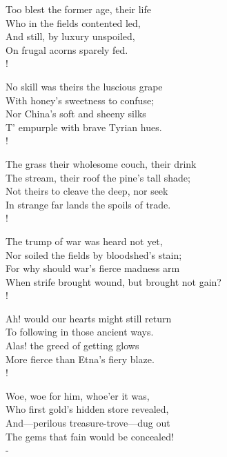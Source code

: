 \documentclass[12pt]{book}
\newenvironment{vpoem}[1]%
  {\def\poemvsindentlines{#1}\begin{poem}\small}%
  {\end{poem}\def\poemvsindentlines{\relax}}
\begin{document}
\begin{vpoem}{24}
    Too blest the former age, their life \\
      Who in the fields contented led, \\
    And still, by luxury unspoiled, \\
      On frugal acorns sparely fed. \\!

    No skill was theirs the luscious grape \\
      With honey's sweetness to confuse; \\
    Nor China's soft and sheeny silks \\
      T' empurple with brave Tyrian hues. \\!

    The grass their wholesome couch, their drink \\
      The stream, their roof the pine's tall shade; \\
    Not theirs to cleave the deep, nor seek \\
      In strange far lands the spoils of trade. \\!

    The trump of war was heard not yet, \\
      Nor soiled the fields by bloodshed's stain; \\
    For why should war's fierce madness arm \\
      When strife brought wound, but brought not gain? \\!

    Ah! would our hearts might still return \\
      To following in those ancient ways. \\
    Alas! the greed of getting glows \\
      More fierce than Etna's fiery blaze. \\!

    Woe, woe for him, whoe'er it was, \\
      Who first gold's hidden store revealed, \\
    And---perilous treasure-trove---dug out \\
      The gems that fain would be concealed! \\-
\end{vpoem}
\end{document}
